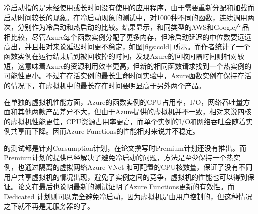 \documentclass[11pt]{article}
\begin{document}
冷启动指的是未经使用或长时间没有使用的应用程序，由于需要重新分配和加载而启动时间较长的现象。在冷启动现象的测试中，\cite{wang2018peeking}对1000种不同的函数，连续调用两次，分别作为冷启动和热启动的比较。结果显示，和同类型的AWS和Google产品相比较，尽管Azure每个函数实例分配了更多内存，但冷启动延迟的中位数要远远高出，并且相对来说延迟时间更不稳定，如图\ref{figs:cold} 所示。而作者统计了一个函数实例在运行结束后到被回收掉的时间，发现Azure的回收间隔时间则相对较短，这意味着Azure的资源利用效率更高，但新的相同函数请求找到一个热实例的可能性更小。不过在存活实例的最长生命时间实验中，Azure函数实例在保持存活的情况下，在虚拟机中的最长存在时间要明显高于另外两个产品。

在单独的虚拟机性能方面，Azure的函数实例的CPU占用率，I/O，网络吞吐量方面和其他两款产品差异不大，但由于Azure提供的虚拟机并不一致，相对来说四核的虚拟机性能更佳，CPU资源占用率更高，而单个实例的I/O和网络吞吐会随着实例共享而下降。因而Azure Functions的性能相对来说并不稳定。

\cite{wang2018peeking}的测试都是针对Consumption计划，在论文撰写时Premium计划还没有推出。而Premium计划的提供已经解决了避免冷启动的问题，方法是至少保持一个热实例，也通过隔离的虚拟网络Azure VNet 和可配置的CPU核数量，保证了没有不同用户共享虚拟机的情况出现，避免了实例之间的竞争，虚拟机的性能也可以得到保证。论文在最后也说明最新的测试证明了Azure Functions更新的有效性。而Dedicated 计划则可以完全避免冷启动，因为虚拟机是由用户控制的，但这种情况之下就不再是无服务器的了。
\end{document}
